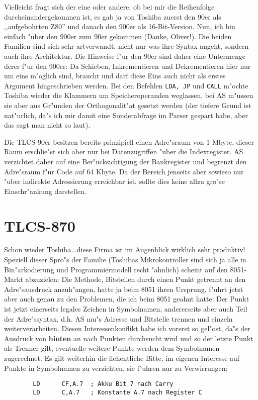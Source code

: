 \documentclass[12pt,a4paper,twoside]{report}
\newcommand{\bb}[1]{{\bf #1}}
\newcommand{\tty}[1]{{\tt #1}}
\begin{document}
Vielleicht fragt sich der eine oder andere, ob bei mir die Reihenfolge
durcheinandergekommen ist, es gab ja von Toshiba zuerst den 90er als
,,aufgebohrten Z80'' und danach den 900er als 16-Bit-Version.  Nun, ich
bin einfach "uber den 900er zum 90er gekommen (Danke, Oliver!).  Die
beiden Familien sind sich sehr artverwandt, nicht nur was ihre Syntax
angeht, sondern auch ihre Architektur.  Die Hinweise f"ur den 90er sind
daher eine Untermenge derer f"ur den 900er: Da Schieben, Inkrementieren
und Dekrementieren hier nur um eins m"oglich sind, braucht und darf diese
Eins auch nicht als erstes Argument hingeschrieben werden.  Bei den
Befehlen \tty{LDA, JP} und \tty{CALL} m"ochte Toshiba wieder die
Klammern um Speicheroperanden weglassen, bei AS m"ussen sie aber aus
Gr"unden der Orthogonalit"at gesetzt werden (der tiefere Grund ist
nat"urlich, da"s ich mir damit eine Sonderabfrage im Parser gespart habe,
aber das sagt man nicht so laut).
\par
Die TLCS-90er besitzen bereits prinzipiell einen Adre"sraum von 1
Mbyte, dieser Raum erschlie"st sich aber nur bei Datenzugriffen "uber
die Indexregister.  AS verzichtet daher auf eine Ber"ucksichtigung
der Bankregister und begrenzt den Adre"sraum f"ur Code auf 64 Kbyte.
Da der Bereich jenseits aber sowieso nur "uber indirekte Adressierung
erreichbar ist, sollte dies keine allzu gro"se Einschr"ankung darstellen.


\section{TLCS-870}

Schon wieder Toshiba...diese Firma ist im Augenblick wirklich sehr
produktiv!  Speziell dieser Spro"s der Familie (Toshibas Mikrokontroller
sind sich ja alle in Bin"arkodierung und Programmiermodell recht "ahnlich)
scheint auf den 8051-Markt abzuzielen: Die Methode, Bitstellen durch einen
Punkt getrennt an den Adre"sausdruck anzuh"angen, hatte ja beim 8051 ihren
Ursprung, f"uhrt jetzt aber auch genau zu den Problemen, die ich beim 8051
geahnt hatte: Der Punkt ist jetzt einerseits legales Zeichen in Symbolnamen,
andererseits aber auch Teil der Adre"ssyntax, d.h. AS mu"s Adresse und
Bitstelle trennen und einzeln weiterverarbeiten.  Diesen Interessenkonflikt
habe ich vorerst so gel"ost, da"s der Ausdruck von \bb{hinten} an nach
Punkten durchsucht wird und so der letzte Punkt als Trenner gilt, eventuelle
weitere Punkte werden dem Symbolnamen zugerechnet.  Es gilt weiterhin die
flehentliche Bitte, im eigenen Interesse auf Punkte in Symbolnamen zu
verzichten, sie f"uhren nur zu Verwirrungen:
\begin{verbatim}
        LD      CF,A.7  ; Akku Bit 7 nach Carry
        LD      C,A.7   ; Konstante A.7 nach Register C
\end{verbatim}
\end{document}
